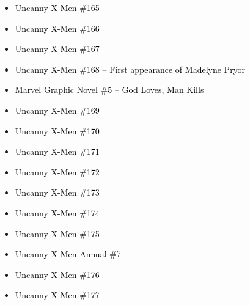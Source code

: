 \documentclass[12pt]{article}
\newcommand{\checkbox}{\raisebox{0.0ex}{\fbox{\rule{0ex}{1.5ex} \rule{1.5ex}{0ex}}}}
\begin{document}
\vspace{0.3cm}
\noindent
\begin{tcolorbox}[
  colback=white!95!gray,
  colframe=black,
  width=\textwidth,
  arc=4mm,
  auto outer arc,
  boxrule=0.8pt,
  left=8pt,right=8pt,top=8pt,bottom=8pt
]
\begin{itemize}[left=0pt,label={\checkbox}]
  \item \textcolor{black}{Uncanny X-Men \#165}
  \item \textcolor{black}{Uncanny X-Men \#166}
  \item \textcolor{black}{Uncanny X-Men \#167}
  \item \textcolor{black}{Uncanny X-Men \#168 – First appearance of Madelyne Pryor}
  \item \textcolor{black}{Marvel Graphic Novel \#5 – God Loves, Man Kills}
  \item \textcolor{black}{Uncanny X-Men \#169}
  \item \textcolor{black}{Uncanny X-Men \#170}
  \item \textcolor{black}{Uncanny X-Men \#171}
  \item \textcolor{black}{Uncanny X-Men \#172}
  \item \textcolor{black}{Uncanny X-Men \#173}
  \item \textcolor{black}{Uncanny X-Men \#174}
  \item \textcolor{black}{Uncanny X-Men \#175}
  \item \textcolor{black}{Uncanny X-Men Annual \#7}
  \item \textcolor{black}{Uncanny X-Men \#176}
  \item \textcolor{black}{Uncanny X-Men \#177}
\end{itemize}
\end{tcolorbox}

\newpage
{}
\end{document}
